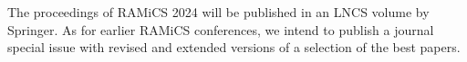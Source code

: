 \documentclass[a3paper, 12pt]{article}
\newcommand*\nfont{\fontsize{16}{19}\selectfont}
\begin{document}
\begin{minipage}[t]{.43\linewidth}
  \nfont%
  The proceedings of RAMiCS 2024 will be published in an LNCS volume
  by Springer.  As for earlier RAMiCS conferences, we intend to
  publish a journal special issue with revised and extended versions
  of a selection of the best papers.







  




  


\end{minipage}
\end{document}
